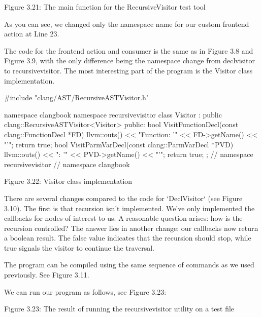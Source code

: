 \begin{center}
Figure 3.21: The main function for the RecursiveVisitor test tool
\end{center}

As you can see, we changed only the namespace name for our custom frontend action at Line 23.

The code for the frontend action and consumer is the same as in Figure 3.8 and Figure 3.9, with the only difference being the namespace change from declvisitor to recursivevisitor. The most interesting part of the program is the Visitor class implementation.

\begin{cpp}
#include "clang/AST/RecursiveASTVisitor.h"

namespace clangbook {
namespace recursivevisitor {
class Visitor : public clang::RecursiveASTVisitor<Visitor> {
public:
  bool VisitFunctionDecl(const clang::FunctionDecl *FD) {
    llvm::outs() << "Function: ’" << FD->getName() << "’\n";
    return true;
  }
  bool VisitParmVarDecl(const clang::ParmVarDecl *PVD) {
    llvm::outs() << "\tParameter: ’" << PVD->getName() << "’\n";
    return true;
  }
};
} // namespace recursivevisitor
} // namespace clangbook
\end{cpp}

\begin{center}
Figure 3.22: Visitor class implementation
\end{center}

There are several changes compared to the code for ‘DeclVisitor‘ (see Figure 3.10). The first is that recursion isn’t implemented. We’ve only implemented the callbacks for nodes of interest to us. A reasonable question arises: how is the recursion controlled? The answer lies in another change: our callbacks now return a boolean result. The false value indicates that the recursion should stop, while true signals the visitor to continue the traversal.

The program can be compiled using the same sequence of commands as we used previously. See Figure 3.11.

We can run our program as follows, see Figure 3.23:


\begin{center}
Figure 3.23: The result of running the recursivevisitor utility on a test file
\end{center}

